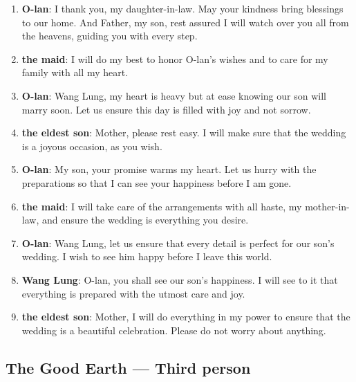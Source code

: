 \documentclass[10pt]{article}
\begin{document}
\begin{enumerate}
\item \textbf{O-lan}: I thank you, my daughter-in-law. May your kindness bring blessings to our home. And Father, my son, rest assured I will watch over you all from the heavens, guiding you with every step.

\item \textbf{the maid}: I will do my best to honor O-lan's wishes and to care for my family with all my heart.

\item \textbf{O-lan}: Wang Lung, my heart is heavy but at ease knowing our son will marry soon. Let us ensure this day is filled with joy and not sorrow.

\item \textbf{the eldest son}: Mother, please rest easy. I will make sure that the wedding is a joyous occasion, as you wish.

\item \textbf{O-lan}: My son, your promise warms my heart. Let us hurry with the preparations so that I can see your happiness before I am gone.

\item \textbf{the maid}: I will take care of the arrangements with all haste, my mother-in-law, and ensure the wedding is everything you desire.

\item \textbf{O-lan}: Wang Lung, let us ensure that every detail is perfect for our son's wedding. I wish to see him happy before I leave this world.

\item \textbf{Wang Lung}: O-lan, you shall see our son's happiness. I will see to it that everything is prepared with the utmost care and joy.

\item \textbf{the eldest son}: Mother, I will do everything in my power to ensure that the wedding is a beautiful celebration. Please do not worry about anything.

\end{enumerate}

\subsection*{The Good Earth --- Third person}
\end{document}
